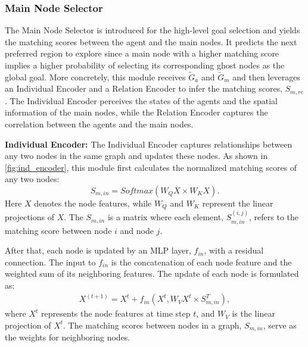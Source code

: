\subsubsection{Main Node Selector}
The Main Node Selector is introduced for the high-level goal selection and yields the matching scores between the agent and the main nodes. It predicts the next preferred region to explore since a main node with a higher matching score implies a higher probability of selecting its corresponding ghost nodes as the global goal. More concretely, this module receives $\tilde{G}_{a}$ and $\tilde{G}_{m}$ and then leverages an Individual Encoder and a Relation Encoder to infer the matching scores, $S_{m, re}$. The Individual Encoder perceives the states of the agents and the spatial information of the main nodes, while the Relation Encoder captures the correlation between the agents and the main nodes. 


\textbf{Individual Encoder:} The Individual Encoder captures relationships between any two nodes in the same graph and updates these nodes. As shown in \cref{fig:ind_encoder}, this module first calculates the normalized matching scores of any two nodes:
\begin{equation}
S_{m, in} = Softmax(W_{Q}X \times W_{K}X).
\end{equation}
Here $X$ denotes the node features, while $W_{Q}$ and $W_{K}$ represent the linear projections of $X$. The $S_{m, in}$ is a matrix where each element, $S_{m, in}^{(i,j)}$, refers to the matching score between node $i$ and node $j$. 


After that, each node is updated by an MLP layer, $f_{in}$, with a residual connection. The input to $f_{in}$ is the concatenation of each node feature and the weighted sum of its neighboring features. The update of each node is formulated as: 
\begin{equation}
    \begin{aligned}
        X^{(t+1)} = X^t
        +f_{in}(X^t,  W_{V}X^t \times S_{m, in}^T),
    \end{aligned}
\end{equation}
where $X^{t}$ represents the node features at time step $t$, and $W_{V}$ is the linear projection of $X^t$. The matching scores between nodes in a graph, $S_{m, in}$, serve as the weights for neighboring nodes. 

